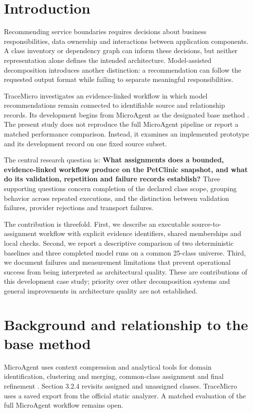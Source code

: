 \section{Introduction}

Recommending service boundaries requires decisions about business responsibilities, data ownership and interactions between application components. A class inventory or dependency graph can inform these decisions, but neither representation alone defines the intended architecture. Model-assisted decomposition introduces another distinction: a recommendation can follow the requested output format while failing to separate meaningful responsibilities.

TraceMicro investigates an evidence-linked workflow in which model recommendations remain connected to identifiable source and relationship records. Its development begins from MicroAgent as the designated base method \cite{su2026}. The present study does not reproduce the full MicroAgent pipeline or report a matched performance comparison. Instead, it examines an implemented prototype and its development record on one fixed source subset.

The central research question is: \textbf{What assignments does a bounded, evidence-linked workflow produce on the PetClinic snapshot, and what do its validation, repetition and failure records establish?} Three supporting questions concern completion of the declared class scope, grouping behavior across repeated executions, and the distinction between validation failures, provider rejections and transport failures.

The contribution is threefold. First, we describe an executable source-to-assignment workflow with explicit evidence identifiers, shared memberships and local checks. Second, we report a descriptive comparison of two deterministic baselines and three completed model runs on a common 25-class universe. Third, we document failures and measurement limitations that prevent operational success from being interpreted as architectural quality. These are contributions of this development case study; priority over other decomposition systems and general improvements in architecture quality are not established.

\section{Background and relationship to the base method}

MicroAgent uses context compression and analytical tools for domain identification, clustering and merging, common-class assignment and final refinement \cite{su2026}. Section 3.2.4 revisits assigned and unassigned classes. TraceMicro uses a saved export from the official static analyzer. A matched evaluation of the full MicroAgent workflow remains open.

